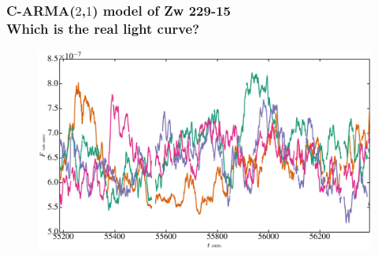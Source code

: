 \documentclass[hyperref={pdfpagelabels=false}]{beamer}
\begin{document}
\begin{frame}
\frametitle{C-ARMA($2$,$1$) model of Zw 229-15\\Which is the real light curve?}
  \begin{figure}
    \includegraphics[scale=0.065]{images/Zw229-15_mockLC.jpg}
  \end{figure}
\end{frame}
\end{document}
